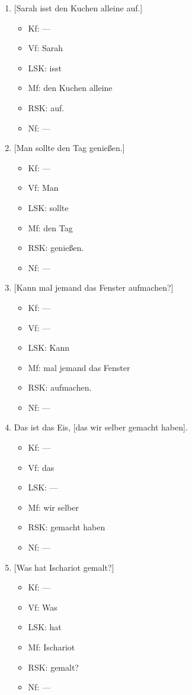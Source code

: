 \begin{enumerate}
  \item{} [Sarah isst den Kuchen alleine auf.]
    \begin{itemize}
      \item Kf: ---
      \item Vf: Sarah
      \item LSK: isst
      \item Mf: den Kuchen alleine
      \item RSK: auf.
      \item Nf: ---
    \end{itemize}
  \item{} [Man sollte den Tag genießen.]
    \begin{itemize}
      \item Kf: ---
      \item Vf: Man
      \item LSK: sollte
      \item Mf: den Tag
      \item RSK: genießen.
      \item Nf: ---
    \end{itemize}
  \item{} [Kann mal jemand das Fenster aufmachen?]
    \begin{itemize}
      \item Kf: ---
      \item Vf: ---
      \item LSK: Kann
      \item Mf: mal jemand das Fenster
      \item RSK: aufmachen.
      \item Nf: ---
    \end{itemize}
  \item Das ist das Eis, [das wir selber gemacht haben].
    \begin{itemize}
      \item Kf: ---
      \item Vf: das
      \item LSK: ---
      \item Mf: wir selber
      \item RSK: gemacht haben
      \item Nf: ---
    \end{itemize}
  \item{} [Was hat Ischariot gemalt?]
    \begin{itemize}
      \item Kf: ---
      \item Vf: Was
      \item LSK: hat
      \item Mf: Ischariot
      \item RSK: gemalt?
      \item Nf: ---
    \end{itemize}



\end{enumerate}
